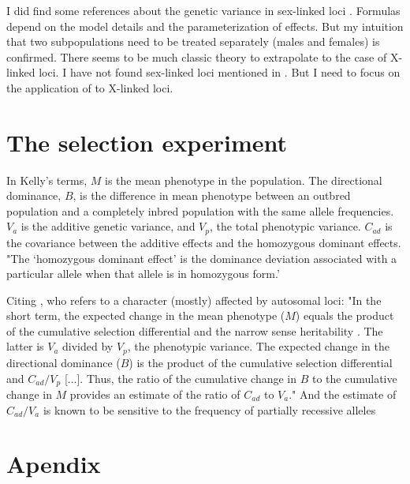 \documentclass[a4paper,12pt]{article}
\begin{document}
I did find some references about the genetic variance in sex-linked loci \cite{James1973,Cowley1986,Connallon2006}. Formulas depend on the model details and the parameterization of effects. But my intuition that two subpopulations need to be treated separately (males and females) is confirmed. There seems to be much classic theory to extrapolate to the case of X-linked loci. I have not found sex-linked loci mentioned in \citet{Falconer1989}. But I need to focus on the application of \citet{Kelly1999} to X-linked loci.

\section{The selection experiment}
In Kelly's terms, $M$ is the mean phenotype in the population. The directional dominance, $B$, is the difference in mean phenotype between an outbred population and a completely inbred population with the same allele frequencies. $V_a$ is the additive genetic variance, and $V_p$, the total phenotypic variance. $C_{ad}$ is the covariance between the additive effects and the homozygous dominant effects. "The `homozygous dominant effect' is the dominance deviation associated with a particular allele when that allele is in homozygous form.'

Citing \citet{Kelly1999}, who refers to a character (mostly) affected by autosomal loci: "In the short term, the expected change in the mean phenotype ($M$) equals the product of the cumulative selection differential and the narrow sense heritability \citep{Falconer1989}. The latter is $V_a$ divided by $V_p$, the phenotypic variance. The expected change in the directional dominance ($B$) is the product of the cumulative selection differential and $C_{ad} / V_p$ [...]. Thus, the ratio of the cumulative change in $B$ to the cumulative change in $M$ provides an estimate of the ratio of $C_{ad}$ to $V_a$." And the estimate of $C_{ad}/V_a$ is known to be sensitive to the frequency of partially recessive alleles

\section{Apendix}



\end{document}
